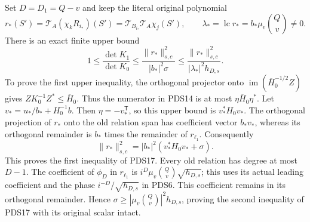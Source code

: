 \documentclass[10pt]{article}
\begin{document}
Set $D=D_1=Q-v$ and keep the literal original polynomial
\[
 r_*(S')=\mathcal T_A(\chi_kR_{i_*})(S')
         =\mathcal T_{B_{i_*}}\mathcal T_A\chi_j(S'),\qquad
 \lambda_*=\operatorname{lc}r_*=b_*\mu_v\binom Qv\ne0.
\tag{PDS16}
\]
There is an exact finite upper bound
\[
 1\le\frac{\det K_1}{\det K_0}
 \le\frac{\|r_*\|_{s,c}^2}{|b_*|^2\sigma}
 \le\frac{\|r_*\|_{s,c}^2}{|\lambda_*|^2h_{D,s}}.
\tag{PDS17}
\]
To prove the first upper inequality, the orthogonal projector onto
$\operatorname{im}(\overline H_0^{-1/2}Z)$ gives
$ZK_0^{-1}Z^*\le\overline H_0$.
Thus the numerator in PDS14 is at most
$\eta\overline H_0\eta^*$.
Let $v_*=u_*/b_*+H_0^{-1}b$. Then $\eta=-v_*^{\mathsf T}$,
so this upper bound is $v_*^*H_0v_*$. The orthogonal
projection of $r_*$ onto the old relation span has coefficient
vector $b_*v_*$, whereas its orthogonal remainder is $b_*$
times the remainder of $r_{\ell_1}$. Consequently
\[
 \|r_*\|_{s,c}^2=|b_*|^2(v_*^*H_0v_*+\sigma).
\tag{PDS18}
\]
This proves the first inequality of PDS17. Every old relation
has degree at most $D-1$. The coefficient of $\phi_D$ in
$r_{\ell_1}$ is
$i^D\mu_v\binom Qv\sqrt{h_{D,s}}$; this uses its actual
leading coefficient and the phase $i^{-D}/\sqrt{h_{D,s}}$
in PDS6. This coefficient remains in its orthogonal remainder.
Hence $\sigma\ge|\mu_v\binom Qv|^2h_{D,s}$, proving the
second inequality of PDS17 with its original scalar intact.
\end{document}
